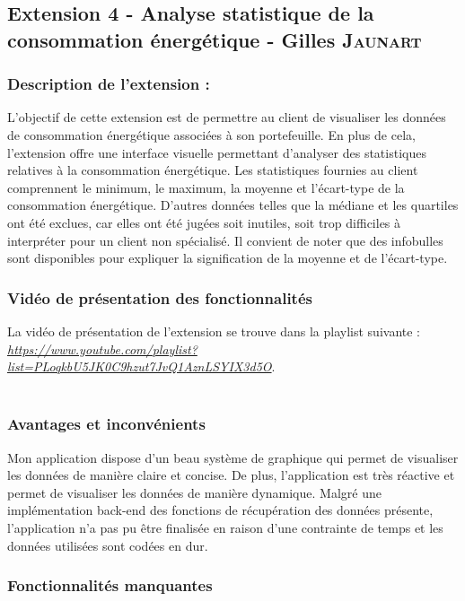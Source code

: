 \documentclass[../rapport.tex]{subfiles}
\begin{document}
\subsection{Extension 4 - Analyse statistique de la consommation énergétique - Gilles \textsc{Jaunart}}

\subsubsection{Description de l'extension :}

L'objectif de cette extension est de permettre au client de visualiser les données de consommation énergétique associées à son portefeuille. En plus de cela, l'extension offre une interface visuelle permettant d'analyser des statistiques relatives à la consommation énergétique. 
Les statistiques fournies au client comprennent le minimum, le maximum, la moyenne et l'écart-type de la consommation énergétique. D'autres données telles que la médiane et les quartiles ont été exclues, car elles ont été jugées soit inutiles, soit trop difficiles à interpréter pour un client non spécialisé. Il convient de noter que des infobulles sont disponibles pour expliquer la signification de la moyenne et de l'écart-type. 

\subsubsection{Vidéo de présentation des fonctionnalités} 
La vidéo de présentation de l'extension se trouve dans la playlist suivante : \href{https://www.youtube.com/playlist?list=PLoqkbU5JK0C9hzut7JvQ1AznLSYIX3d5O}{\textit{https://www.youtube.com/playlist?list=PLoqkbU5JK0C9hzut7JvQ1AznLSYIX3d5O}}. \\ \\

\subsubsection{Avantages et inconvénients} 
Mon application dispose d'un beau système de graphique qui permet de visualiser les données de manière claire et concise. De plus, l'application est très réactive et permet de visualiser les données de manière dynamique. Malgré une implémentation back-end des fonctions de récupération des données présente, l'application n'a pas pu être finalisée en raison d'une contrainte de temps et les données utilisées sont codées en dur.

\subsubsection{Fonctionnalités manquantes} 
\end{document}
